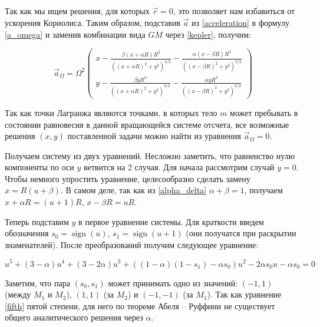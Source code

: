 \documentclass[12pt]{article}
\DeclareMathOperator{\sign}{sign}
\begin{document}
    Так как мы ищем решения, для которых $\dot{\vec{r}} = 0$, это
    позволяет нам избавиться от ускорения Кориолиса. Таким образом, подставив 
    $\vec{a}$ из \ref{acceleration} в формулу \ref{a_omega} и заменив
    комбинации вида $GM$ через \ref{kepler}, получим:

    \begin{equation}
        \vec{a}_{\Omega} = \Omega^2
        \begin{pmatrix}
            x - \frac{\beta (x + \alpha R)R^3}{((x + \alpha R)^2 + y^2)^{3/2}} - 
            \frac{\alpha (x - \beta R)R^3}{((x - \beta R)^2 + y^2)^{3/2}} \\
            y - \frac{\beta y R^3}{((x + \alpha R)^2 + y^2)^{3/2}} - 
            \frac{\alpha y R^3}{((x - \beta R)^2 + y^2)^{3/2}}
        \end{pmatrix}
    \end{equation}

    \par Так как точки Лагранжа являются точками, в которых тело $m$ может пребывать в 
    состоянии равновесия в данной вращающейся системе отсчета, все возможные решения
    $(x,y)$ поставленной задачи можно найти из уравнения $\vec{a}_{\Omega} = 0$.

    \par Получаем систему из двух уравнений. Несложно заметить, что равненство
    нулю компоненты по оси $y$ ветвится на 2 случая. Для начала рассмотрим 
    случай $y = 0$. Чтобы немного упростить уравнение, 
    целесообразно сделать замену $x = R(u + \beta)$. В самом деле, так как
    из \ref{alpha_delta} $\alpha + \beta = 1$, получаем $x + \alpha R = (u + 1)R$,
    $x - \beta R = uR$. 
    
    \par Теперь подставим $y$ в первое уравнение системы. Для краткости
    введем обозначения $s_0 = \sign(u)$, $s_1 = \sign(u + 1)$ (они получатся
    при раскрытии знаменателей). После преобразований получим следующее уравнение:

    \begin{equation}
        u^5 + (3 - \alpha)u^4 + (3 - 2\alpha)u^3 + ((1-\alpha)(1 - s_1) - 
        \alpha s_0)u^2 - 2\alpha s_0 u - \alpha s_0 = 0
        \label{fifth}
    \end{equation}

    \par Заметим, что пара $(s_0, s_1)$ может принимать одно из значений:
    $(-1, 1)$ (между $M_1$ и $M_2$), $(1, 1)$ (за $M_2$) и $(-1, -1)$ (за $M_1$). 
    Так как уравнение \ref{fifth} пятой степени,
    для него по теореме Абеля -- Руффини \cite{alexeev} не существует общего аналитического решения
    через $\alpha$. 
\end{document}
